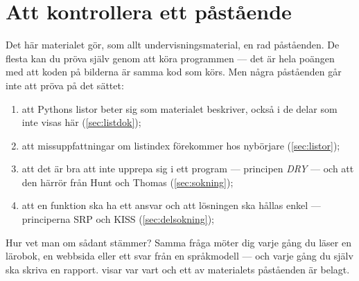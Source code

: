 \chapter{Att kontrollera ett påstående}
\label{app:verifiera-listor}

Det här materialet gör, som allt undervisningsmaterial, en rad
påståenden.  De flesta kan du pröva själv genom att köra programmen ---
det är hela poängen med att koden på bilderna är samma kod som körs.  Men
några påståenden går inte att pröva på det sättet:
\begin{enumerate}
  \item att Pythons listor beter sig som materialet beskriver, också i de
    delar som inte visas här (\cref{sec:listdok});
  \item att missuppfattningar om listindex förekommer hos nybörjare
    (\cref{sec:listor});
  \item att det är bra att inte upprepa sig i ett program --- principen
    \emph{DRY} --- och att den härrör från Hunt och Thomas
    (\cref{sec:sokning});
  \item att en funktion ska ha ett ansvar och att lösningen ska hållas
    enkel --- principerna \foreignlanguage{english}{SRP} och
    \foreignlanguage{english}{KISS} (\cref{sec:delsokning});
\end{enumerate}
Hur vet man om sådant stämmer?  Samma fråga möter dig varje gång du läser
en lärobok, en webbsida eller ett svar från en språkmodell --- och varje
gång du själv ska skriva en rapport.
 visar var vart och ett av materialets
påståenden är belagt.

